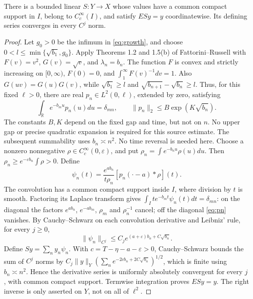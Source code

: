 \begin{proposition}\label{prop:rightinverse}
There is a bounded linear \(S:Y\to X\) whose values have a common compact support in \(I\), belong to \(C_c^\infty(I)\), and satisfy \(ESy=y\) coordinatewise. Its defining series converges in every \(C^j\) norm.
\end{proposition}
\begin{proof}
Let \(g_0>0\) be the infimum in \eqref{eq:growth}, and choose \(0<l\le \min\{\sqrt{b_1},g_0\}\). Apply Theorems 1.2 and 1.5(b) of Fattorini--Russell \cite{FattoriniRussell1974} with \(F(v)=v^2\), \(G(v)=\sqrt v\), and \(\lambda_n=b_n\). The function \(F\) is convex and strictly increasing on \([0,\infty)\), \(F(0)=0\), and \(\int_1^\infty F(v)^{-1}dv=1\). Also \(G(uv)=G(u)G(v)\), while \(\sqrt{b_1}\ge l\) and \(\sqrt{b_{n+1}}-\sqrt{b_n}\ge l\). Thus, for this fixed \(\ell>0\), there are real \(p_n\in L^2(0,\ell)\), extended by zero, satisfying
\begin{equation}\label{eq:pn}
\int_{\mathbb R}e^{-b_mu}p_n(u)du=\delta_{mn},\qquad \|p_n\|_2\le B\exp(K\sqrt{b_n}).
\end{equation}
The constants \(B,K\) depend on the fixed gap and time, but not on \(n\). No upper gap or precise quadratic expansion is required for this source estimate. The subsequent summability uses \(b_n\asymp n^2\). No time reversal is needed here.
Choose a nonzero nonnegative \(\rho\in C_c^\infty(0,\varepsilon)\), and put \(\rho_n=\int e^{-b_nu}\rho(u)du\). Then \(\rho_n\ge e^{-\varepsilon b_n}\int\rho>0\). Define
\begin{equation}\label{eq:psi}
\psi_n(t)=\frac{e^{ab_n}}{t\rho_n}[p_n(\cdot-a)*\rho](t).
\end{equation}
The convolution has a common compact support inside \(I\), where division by \(t\) is smooth. Factoring its Laplace transform gives \(\int_I te^{-b_mt}\psi_n(t)dt=\delta_{mn}\): on the diagonal the factors \(e^{ab_n}\), \(e^{-ab_m}\), \(\rho_m\) and \(\rho_n^{-1}\) cancel; off the diagonal \eqref{eq:pn} vanishes. By Cauchy--Schwarz on each convolution derivative and Leibniz' rule, for every \(j\ge0\),
\begin{equation}\label{eq:psibound}
\|\psi_n\|_{C^j}\le C_j e^{(a+\varepsilon)b_n+C\sqrt{b_n}}.
\end{equation}
Define \(Sy=\sum_n y_n\psi_n\). With \(c=T-\eta-a-\varepsilon>0\), Cauchy--Schwarz bounds the sum of \(C^j\) norms by \(C_j\|y\|_Y(\sum_n e^{-2cb_n+2C\sqrt{b_n}})^{1/2}\), which is finite using \(b_n\asymp n^2\). Hence the derivative series is uniformly absolutely convergent for every \(j\), with common compact support. Termwise integration proves \(ESy=y\). The right inverse is only asserted on \(Y\), not on all of \(\ell^2\).
\end{proof}
